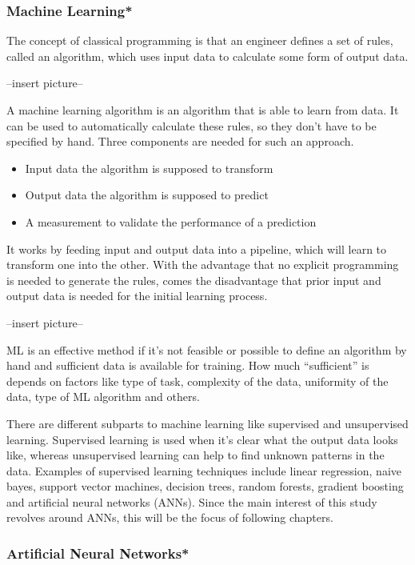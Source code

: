 \subsubsection{Machine Learning*}

The concept of classical programming is that an engineer defines a set of rules, called an algorithm, which uses input data to calculate some form of output data\cite{Chollet2017}.

--insert picture--

A machine learning algorithm is an algorithm that is able to learn from data\cite{Goodfellow2016}. It can be used to automatically calculate these rules, so they don't have to be specified by hand. Three components are needed for such an approach.

\begin{itemize}
\item Input data the algorithm is supposed to transform
\item Output data the algorithm is supposed to predict
\item A measurement to validate the performance of a prediction
\end{itemize}

It works by feeding input and output data into a pipeline, which will learn to transform one into the other. With the advantage that no explicit programming is needed to generate the rules, comes the disadvantage that prior input and output data is needed for the initial learning process.

--insert picture--

ML is an effective method if it's not feasible or possible to define an algorithm by hand and sufficient data is available for training. How much “sufficient” is depends on factors like type of task, complexity of the data, uniformity of the data, type of ML algorithm and others.

There are different subparts to machine learning like supervised and unsupervised learning. Supervised learning is used when it's clear what the output data looks like, whereas unsupervised learning can help to find unknown patterns in the data. Examples of supervised learning techniques include linear regression, naive bayes, support vector machines, decision trees, random forests, gradient boosting and artificial neural networks (ANNs). Since the main interest of this study revolves around ANNs, this will be the focus of following chapters.

\subsubsection{Artificial Neural Networks*}

